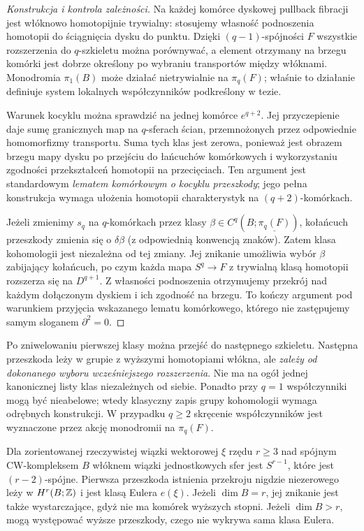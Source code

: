 \begin{proof}[Konstrukcja i kontrola zależności]
Na każdej komórce dyskowej pullback fibracji jest
włóknowo homotopijnie trywialny: stosujemy własność
podnoszenia homotopii do ściągnięcia dysku do punktu.
Dzięki $(q-1)$-spójności $F$ wszystkie rozszerzenia do
$q$-szkieletu można porównywać, a element otrzymany na
brzegu komórki jest dobrze określony po wybraniu transportów
między włóknami. Monodromia $\pi_1(B)$ może działać
nietrywialnie na $\pi_q(F)$; właśnie to działanie definiuje
system lokalnych współczynników podkreślony w tezie.

Warunek kocyklu można sprawdzić na jednej komórce
$e^{q+2}$. Jej przyczepienie daje sumę granicznych map na
$q$-sferach ścian, przemnożonych przez odpowiednie
homomorfizmy transportu. Suma tych klas jest zerowa,
ponieważ jest obrazem brzegu mapy dysku po przejściu do
łańcuchów komórkowych i wykorzystaniu zgodności
przekształceń homotopii na przecięciach. Ten argument
jest standardowym \emph{lematem komórkowym o kocyklu
przeszkody}; jego pełna konstrukcja wymaga ułożenia
homotopii charakterystyk na $(q+2)$-komórkach.

Jeżeli zmienimy $s_q$ na $q$-komórkach przez klasy
$\beta\in C^q(B;\underline{\pi_q(F)})$, kołańcuch
przeszkody zmienia się o $\delta\beta$ (z odpowiednią
konwencją znaków). Zatem klasa kohomologii jest
niezależna od tej zmiany. Jej znikanie umożliwia wybór
$\beta$ zabijający kołańcuch, po czym każda mapa
$S^q\to F$ z trywialną klasą homotopii rozszerza się
na $D^{q+1}$. Z własności podnoszenia otrzymujemy
przekrój nad każdym dołączonym dyskiem i ich zgodność
na brzegu. To kończy argument pod warunkiem przyjęcia
wskazanego lematu komórkowego, którego nie zastępujemy
samym sloganem $\partial^2=0$.
\end{proof}
\begin{uwaga}
Po zniwelowaniu pierwszej klasy można przejść do następnego
szkieletu. Następna przeszkoda leży w grupie z wyższymi
homotopiami włókna, ale \emph{zależy od dokonanego wyboru
wcześniejszego rozszerzenia}. Nie ma na ogół jednej
kanonicznej listy klas niezależnych od siebie.
Ponadto przy $q=1$ współczynniki mogą być nieabelowe;
wtedy klasyczny zapis grupy kohomologii wymaga odrębnych
konstrukcji. W przypadku $q\ge2$ skręcenie współczynników
jest wyznaczone przez akcję monodromii na $\pi_q(F)$.
\end{uwaga}
\begin{przyklad}
Dla zorientowanej rzeczywistej wiązki wektorowej $\xi$ rzędu
$r\ge3$ nad spójnym CW-kompleksem $B$ włóknem wiązki
jednostkowych sfer jest $S^{r-1}$, które jest $(r-2)$-spójne.
Pierwsza przeszkoda istnienia przekroju nigdzie niezerowego
leży w $H^r(B;\mathbb{Z})$ i jest klasą Eulera $e(\xi)$.
Jeżeli $\dim B=r$, jej znikanie jest także wystarczające,
gdyż nie ma komórek wyższych stopni. Jeżeli
$\dim B>r$, mogą występować wyższe przeszkody, czego
nie wykrywa sama klasa Eulera.
\end{przyklad}
